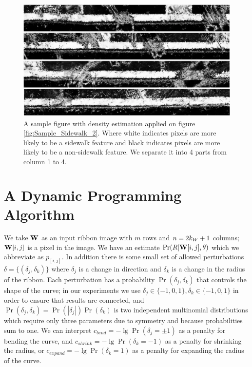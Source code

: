 \begin{figure}[H]
    \centering
    \includegraphics[width=\textwidth]{Figures/GMM_SAMPLE2.png}
    \caption[Density Estimation on Sample Sidewalk]{
    A sample figure with density estimation applied on figure \ref{fig:Sample_Sidewalk_2}. Where
    white indicates pixels are more likely to be a sidewalk feature and black indicates pixels are
    more likely to be a non-sidewalk feature. We separate it into 4 parts from column 1 to 4.}
    \label{fig:GMM_Sample_2}
\end{figure}


\section{A Dynamic Programming Algorithm}

We take $\mathbf{W}{}$ as an input ribbon image with $m$ rows and $n=2k_W+1$ columns;
 $\mathbf{W}{}{[i,j]}$ is a pixel in the image. 
We have an estimate $\Pr(R|\mathbf{W}{}{[i,j]}, \theta)$ which we abbreviate as $p_{[i,j]}$. 
In addition there is some small set of allowed perturbations 
$\delta=\{(\delta_j, \delta_k)\}$ where $\delta_j$ is a change in direction 
and $\delta_k$ is a change in the radius of the ribbon. 
Each perturbation has a probability $\Pr(\delta_j, \delta_k)$ that controls 
the shape of the curve; in our experiments we use $\delta_j\in\{-1,0,1\}, \delta_k\in\{-1, 0,1\}$ in order 
to ensure that results are connected, and  $\Pr(\delta_j, \delta_k)=\Pr(|\delta_j|)\Pr(\delta_k)$ is 
two independent multinomial distributions which require only three parameters due to symmetry 
and because probabilities sum to one. 
We can interpret $c_\mathit{bend}=-\lg \Pr(\delta_j=\pm1)$ as a penalty for bending the 
curve, and $c_\mathit{shrink}=-\lg \Pr(\delta_k=-1)$ as a penalty for shrinking the radius,
 or $c_\mathit{expand} = -\lg \Pr(\delta_k=1)$ as a penalty for expanding the radius of the curve. 


